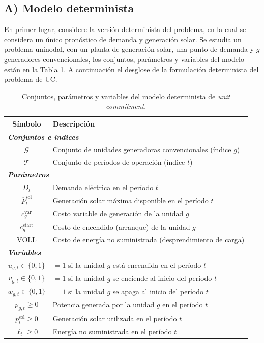 \documentclass[
	spanish, %
	letterpaper, oneside
]{article}
\begin{document}
\subsection*{A) Modelo determinista}

En primer lugar, considere la versión determinista del problema, en la cual se considera un único pronóstico de demanda y generación solar. Se estudia un problema uninodal, con un planta de generación solar, una punto de demanda y $g$ generadores convencionales, los conjuntos, parámetros y variables del modelo están en la Tabla \ref{tab:notacion_det}. A continuación el desglose de la formulación determinista del problema de UC.


\begin{table}[h]
\centering
\renewcommand{\arraystretch}{1.3}
\begin{tabular}{c l}
\toprule
\textbf{Símbolo} & \textbf{Descripción} \\
\midrule
\multicolumn{2}{l}{\textbf{\textit{Conjuntos e índices}}} \\
\midrule
$\mathcal{G}$ & Conjunto de unidades generadoras convencionales (índice $g$) \\
$\mathcal{T}$ & Conjunto de períodos de operación (índice $t$) \\
\midrule
\multicolumn{2}{l}{\textbf{\textit{Parámetros}}} \\
\midrule
$D_{t}$ & Demanda eléctrica en el período $t$ \\
$\overline{P}^{\text{sol}}_{t}$ & Generación solar máxima disponible en el período $t$ \\
$c_{g}^{\text{var}}$ & Costo variable de generación de la unidad $g$ \\
$c_{g}^{\text{start}}$ & Costo de encendido (arranque) de la unidad $g$ \\
$\text{VOLL}$ & Costo de energía no suministrada (desprendimiento de carga) \\
\midrule
\multicolumn{2}{l}{\textbf{\textit{Variables}}} \\
\midrule
$u_{g,t}\in\{0,1\}$ & $=1$ si la unidad $g$ está encendida en el período $t$ \\
$v_{g,t}\in\{0,1\}$ & $=1$ si la unidad $g$ se enciende al inicio del período $t$ \\
$w_{g,t}\in\{0,1\}$ & $=1$ si la unidad $g$ se apaga al inicio del período $t$ \\
$p_{g,t}\geq 0$ & Potencia generada por la unidad $g$ en el período $t$ \\
$p^{\text{sol}}_{t}\geq 0$ & Generación solar utilizada en el período $t$ \\
$\ell_{t}\geq 0$ & Energía no suministrada en el período $t$ \\
\bottomrule
\end{tabular}
\caption{Conjuntos, parámetros y variables del modelo determinista de \textit{unit commitment}.}
\label{tab:notacion_det}
\end{table}
\end{document}
